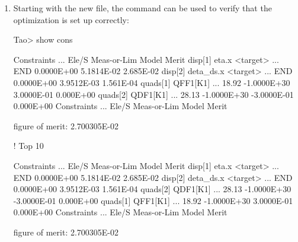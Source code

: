 \documentclass{hitec}     %
\begin{document}
{\begin{enumerate}[leftmargin=*]
This  file has a namelist  in which , the number of optimization cycles, is set equal to 100 (the default is 20). 
When the optimizer goes through , this
is called a . Before each loop, the derivatives of how much the  changes with change in
 is computed. Periodic recomputation is needed since lattices are never linear and so the derivatives change as variables are varied. Also in the  namelist the number of loops,
which is set by , is set to 100 (the default is one).
These are two of many parameters that can be set to customize the \tao experience. See the \tao manual for more options.

The  file has two datums, one for the horizontal dispersion  and one for its slope . 
Both are desired to be exactly zero at the end of the lattice and they have equal weight. 
Additionally, the variables are the k1 strength of the two special quadrupoles  and . 
%
\item
Starting \tao with the new  file, the  command can be used to
verify that the optimization is set up correctly:
\begin{code}
Tao> show cons

Constraints                  ...   Ele/S  Meas-or-Lim    Model       Merit 
disp[1]   eta.x <target>     ...   END      0.0000E+00   5.1814E-02  2.685E-02
disp[2]   deta_ds.x <target> ...   END      0.0000E+00   3.9512E-03  1.561E-04
quads[1]  QFF1[K1]           ...   18.92   -1.0000E+30   3.0000E-01  0.000E+00
quads[2]  QDF1[K1]           ...   28.13   -1.0000E+30  -3.0000E-01  0.000E+00
Constraints                  ...   Ele/S  Meas-or-Lim    Model       Merit 

 figure of merit: 2.700305E-02

! Top 10

Constraints                  ...   Ele/S   Meas-or-Lim    Model       Merit
disp[1]   eta.x <target>     ...   END       0.0000E+00   5.1814E-02  2.685E-02
disp[2]   deta_ds.x <target> ...   END       0.0000E+00   3.9512E-03  1.561E-04
quads[2]  QDF1[K1]           ...   28.13    -1.0000E+30  -3.0000E-01  0.000E+00
quads[1]  QFF1[K1]           ...   18.92    -1.0000E+30   3.0000E-01  0.000E+00
Constraints                  ...   Ele/S   Meas-or-Lim    Model       Merit 

 figure of merit: 2.700305E-02


\end{code}
\end{enumerate}}
\end{document}
